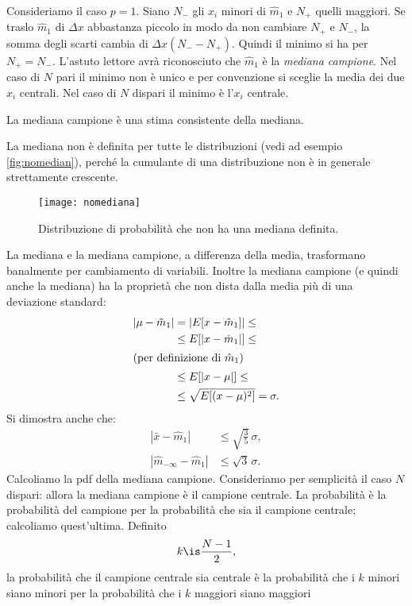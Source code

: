 Consideriamo il caso $p=1$.
Siano $N_-$ gli $x_i$ minori di $\hat m_1$ e $N_+$ quelli maggiori.
Se traslo $\hat m_1$ di $\Delta x$ abbastanza piccolo in modo da non cambiare $N_+$ e $N_-$,
la somma degli scarti cambia di $\Delta x(N_- - N_+)$.
Quindi il minimo si ha per $N_+ = N_-$.
L'astuto lettore avrà riconosciuto che $\hat m_1$ è la \emph{mediana campione}.
Nel caso di $N$ pari il minimo non è unico e per convenzione si sceglie la media dei due $x_i$ centrali.
Nel caso di $N$ dispari il minimo è l'$x_i$ centrale.
\begin{fact}
	La mediana campione è una stima consistente della mediana.
\end{fact}
La mediana non è definita per tutte le distribuzioni (vedi ad esempio \autoref{fig:nomedian}),
perché la cumulante di una distribuzione non è in generale strettamente crescente.
\begin{figure}
	\centering
	\texttt{[image: nomediana]}
	\caption{\label{fig:nomedian}%
	Distribuzione di probabilità che non ha una mediana definita.}
\end{figure}
La mediana e la mediana campione,
a differenza della media,
trasformano banalmente per cambiamento di variabili.
Inoltre la mediana campione (e quindi anche la mediana) ha la proprietà che non dista dalla media più di una deviazione standard:
\begin{align*}
	|\mu-\hat m_1|
	&= |E[x-\hat m_1]| \le \\
	&\le E[|x-\hat m_1|] \le \\
	\intertext{(per definizione di $\hat m_1$)}
	&\le E[|x-\mu|] \le \\
	&\le \sqrt{E[(x-\mu)^2]} = \sigma.
\end{align*}
Si dimostra anche che:
\begin{align*}
	|\bar x - \hat m_1|
	&\le \sqrt{\frac35}\,\sigma, \\
	|\hat m_{-\infty} - \hat m_1|
	&\le \sqrt3\,\sigma.
\end{align*}
Calcoliamo la pdf della mediana campione.
Consideriamo per semplicità il caso $N$ dispari:
allora la mediana campione è il campione centrale.
La probabilità è la probabilità del campione per la probabilità che sia il campione centrale;
calcoliamo quest'ultima.
Definito
\begin{equation*}
	k \is \frac{N-1}2,
\end{equation*}
la probabilità che il campione centrale sia centrale è
la probabilità che i $k$ minori siano minori
per la probabilità che i $k$ maggiori siano maggiori
